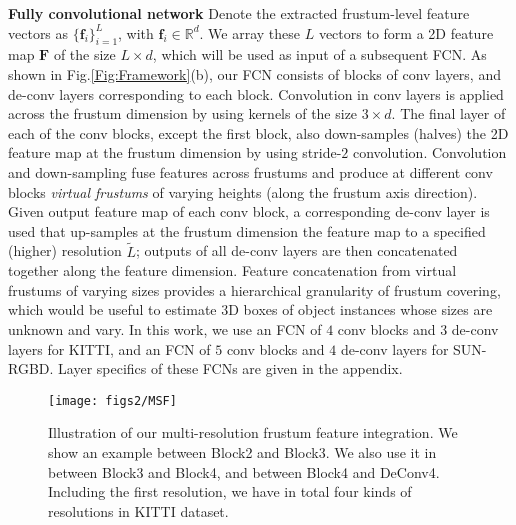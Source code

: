\documentclass[letterpaper, 10 pt, conference]{ieeeconf}
\begin{document}
\vspace{0.1cm}
\noindent\textbf{Fully convolutional network}
Denote the extracted frustum-level feature vectors as $\{ \mathbf{f}_i \}_{i=1}^L$, with $\mathbf{f}_i \in \mathbb{R}^d$. We array these $L$ vectors to form a 2D feature map $\mathbf{F}$ of the size $L\times d$, which will be used as input of a subsequent FCN. As shown in Fig.\ref{Fig:Framework}(b), our FCN consists of blocks of conv layers, and de-conv layers corresponding to each block. Convolution in conv layers is applied across the frustum dimension by using kernels of the size $3\times d$. The final layer of each of the conv blocks, except the first block, also down-samples (halves) the 2D feature map at the frustum dimension by using stride-$2$ convolution. Convolution and down-sampling fuse features across frustums and produce at different conv blocks \emph{virtual frustums} of varying heights (along the frustum axis direction). Given output feature map of each conv block, a corresponding de-conv layer is used that up-samples at the frustum dimension the feature map to a specified (higher) resolution $\tilde{L}$; outputs of all de-conv layers are then concatenated together along the feature dimension. Feature concatenation from virtual frustums of varying sizes provides a hierarchical granularity of frustum covering, which would be useful to estimate 3D boxes of object instances whose sizes are unknown and vary. In this work, we use an FCN of $4$ conv blocks and $3$ de-conv layers for KITTI, and an FCN of $5$ conv blocks and $4$ de-conv layers for SUN-RGBD. Layer specifics of these FCNs are given in the appendix.

\begin{figure}
	\begin{center}
	\texttt{[image: figs2/MSF]}
	\caption[]{Illustration of our multi-resolution frustum feature integration. We show an example between Block2 and Block3. We also use it in between Block3 and Block4, and between Block4 and DeConv4. Including the first resolution, we have in total four kinds of resolutions in KITTI dataset.}
	\label{Fig:MSF}
	\end{center}
	\vspace{-0.5cm}
\end{figure}
\end{document}
